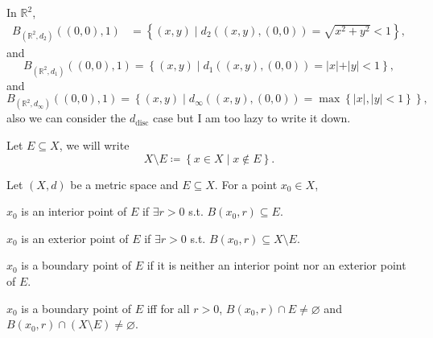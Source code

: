 \begin{eg}
    In \(\mathbb{R} ^2\), 
    \begin{align*}
        B_{(\mathbb{R} ^2, d_2)} \left( (0, 0), 1 \right) &= \left\{ (x, y) \mid d_2 ((x, y), (0, 0)) = \sqrt{x^2 + y^2}  < 1 \right\},
    \end{align*}
    and 
    \[
        B_{(\mathbb{R} ^2, d_1)}((0,0), 1) = \left\{ (x, y) \mid d_1((x, y), (0, 0)) = \vert x \vert + \vert y \vert < 1   \right\}, 
    \] and 
    \[
        B_{(\mathbb{R} ^2, d_\infty)} ((0,0), 1) = \left\{ (x, y) \mid d_\infty ((x, y), (0, 0)) = \max \left\{ \vert x \vert, \vert y \vert < 1   \right\}  \right\},
    \]
    also we can consider the \(d_{\text{disc}}\) case but I am too lazy to write it down. 
\end{eg}

\begin{notation}
    Let \(E \subseteq X\), we will write 
    \[
        X \setminus E \coloneqq  \left\{ x \in X \mid x \notin E\right\}. 
    \] 
\end{notation}

\begin{definition*}
    Let \((X, d)\) be a metric space and \(E \subseteq X\). For a point \(x_0 \in X\),
    \begin{definition} \label{def: interior point}
        \(x_0\) is an interior point of \(E\) if \(\exists r > 0\) s.t. \(B(x_0, r) \subseteq E\).     
    \end{definition}
    \begin{definition} \label{def: exterior point}
        \(x_0\) is an exterior point of \(E\) if \(\exists r > 0\) s.t. \(B(x_0, r) \subseteq X \setminus E\).    
    \end{definition}
    \begin{definition} \label{def: boundary point}
        \(x_0\) is a boundary point of \(E\) if it is neither an interior point nor an exterior point of \(E\).   
    \end{definition}
\end{definition*}

\begin{proposition}
    \(x_0\) is a boundary point of \(E\) iff for all \(r>0\), \(B(x_0, r) \cap E \neq \varnothing \) and \(B(x_0, r) \cap \left( X \setminus E \right) \neq \varnothing\).     
\end{proposition}